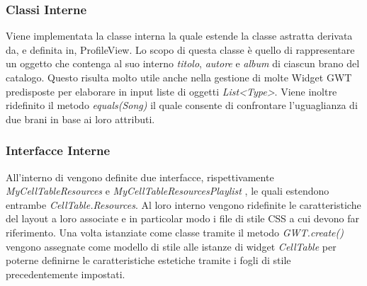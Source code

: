 \subsubsection*{Classi Interne} Viene implementata la classe interna  la quale estende la classe astratta  derivata da, e definita in, ProfileView. Lo scopo di questa classe \`e quello di rappresentare un oggetto che contenga al suo interno \emph{titolo}, \emph{autore} e \emph{album} di ciascun brano del catalogo. Questo risulta molto utile anche nella gestione di molte Widget GWT predisposte per elaborare in input liste di oggetti \emph{List\textless Type\textgreater}. Viene inoltre ridefinito il metodo \emph{equals(Song)} il quale consente di confrontare l'uguaglianza di due brani in base ai loro attributi.
\subsubsection*{Interfacce Interne}
All'interno di  vengono definite due interfacce,
rispettivamente \emph{MyCellTableResources} e
\emph{MyCellTableResourcesPlaylist }, le quali estendono entrambe
\emph{CellTable.Resources}. Al loro interno vengono ridefinite le
caratteristiche del layout a loro associate e in particolar modo i file di stile
CSS a cui devono far riferimento. Una volta istanziate come classe
tramite il metodo \emph{GWT.create()} vengono assegnate come modello di stile
alle istanze di widget \emph{CellTable} per poterne definirne le caratteristiche
estetiche tramite i fogli di stile precedentemente impostati.
\\
